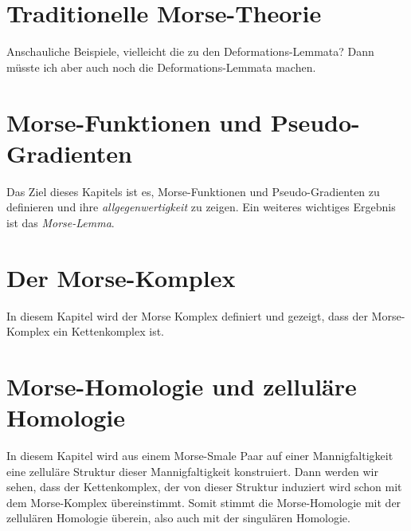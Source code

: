 \documentclass[a4paper,12pt,twoside]{scrreport}
\begin{document}
\makeheaderfancy
\setcounter{page}{1}

\chapter{Traditionelle Morse-Theorie}

Anschauliche Beispiele, vielleicht die zu den Deformations-Lemmata? Dann müsste
ich aber auch noch die Deformations-Lemmata machen.




\chapter{Morse-Funktionen und Pseudo-Gradienten}

Das Ziel dieses Kapitels ist es, Morse-Funktionen und Pseudo-Gradienten zu
definieren und ihre 
\textit{allgegenwertigkeit} zu zeigen. Ein weiteres wichtiges Ergebnis ist
das \textit{Morse-Lemma}.





\chapter{Der Morse-Komplex}
In diesem Kapitel wird der Morse Komplex definiert und gezeigt, dass der 
Morse-Komplex ein Kettenkomplex ist.




\chapter{Morse-Homologie und zelluläre Homologie}

In diesem Kapitel wird aus einem Morse-Smale Paar auf einer Mannigfaltigkeit
eine zelluläre Struktur dieser Mannigfaltigkeit konstruiert. Dann werden wir 
sehen, dass der Kettenkomplex, der von dieser Struktur induziert wird schon mit
dem Morse-Komplex übereinstimmt. Somit stimmt die Morse-Homologie mit der 
zellulären Homologie überein, also auch mit der singulären Homologie.






\appendix



\printbibliography

\eject
\end{document}
